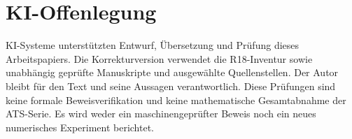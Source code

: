 \section*{KI-Offenlegung}
KI-Systeme unterstützten Entwurf, Übersetzung und Prüfung dieses
Arbeitspapiers. Die Korrekturversion verwendet die R18-Inventur sowie
unabhängig geprüfte Manuskripte und ausgewählte Quellenstellen.
Der Autor bleibt für den Text und seine Aussagen verantwortlich.
Diese Prüfungen sind keine formale Beweisverifikation und keine
mathematische Gesamtabnahme der ATS-Serie. Es wird weder ein
maschinengeprüfter Beweis noch ein neues numerisches Experiment berichtet.
